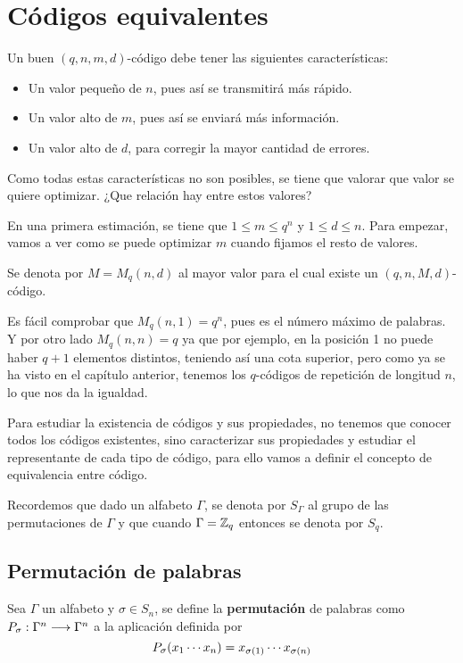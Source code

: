 \section{Códigos equivalentes}

Un buen $(q, n, m, d)$-código debe tener las siguientes características:
\begin{itemize}
	\item Un valor pequeño de $n$, pues así se transmitirá más rápido.
	\item Un valor alto de $m$, pues así se enviará más información.
	\item Un valor alto de $d$, para corregir la mayor cantidad de errores.
\end{itemize}

Como todas estas características no son posibles, se tiene que valorar que valor se quiere optimizar.
¿Que relación hay entre estos valores?

En una primera estimación, se tiene que $1\leq m\leq q^n$ y $1\leq d\leq n$.
Para empezar, vamos a ver como se puede optimizar $m$ cuando fijamos el resto de valores.

\begin{definition}
	Se denota por $M = M_q(n, d)$ al mayor valor para el cual existe un $(q, n, M, d)$-código.
\end{definition}

Es fácil comprobar que $M_q(n, 1)=q^n$, pues es el número máximo de palabras.
Y por otro lado $M_q(n, n)=q$ ya que por ejemplo, en la posición 1 no puede haber $q+1$ elementos distintos, teniendo así una cota superior, pero como ya se ha visto en el capítulo anterior, tenemos los $q$-códigos de repetición de longitud $n$, lo que nos da la igualdad.

Para estudiar la existencia de códigos y sus propiedades, no tenemos que conocer todos los códigos existentes, sino caracterizar sus propiedades y estudiar el representante de cada tipo de código, para ello vamos a definir el concepto de equivalencia entre código.

Recordemos que dado un alfabeto $\Gamma$, se denota por $S_\Gamma$ al grupo de las permutaciones de $\Gamma$ y que cuando $\Gamma = \mathbb{Z}_q$ entonces se denota por $S_q$.

\subsection{Permutación de palabras}

\begin{definition}
	Sea $\Gamma$ un alfabeto y $\sigma\in S_n$, se define la \textbf{permutación} de palabras como $P_{\sigma}:\Gamma^n\longrightarrow \Gamma^n$ a la aplicación definida por
	\[
		P_{\sigma}(x_1\cdots x_{n})=x_{\sigma(1)}\cdots x_{\sigma(n)}
	\]
\end{definition}

